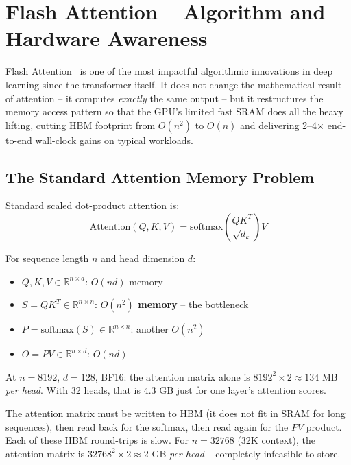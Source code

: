 \section{Flash Attention -- Algorithm and Hardware Awareness}
\label{flash-attention-algorithm-and-hardware-awareness}

Flash Attention~\cite{dao2022flashattention, dao2023flashattention2} is one of the most impactful algorithmic innovations in deep learning since the transformer itself. It does not change the mathematical result of attention -- it computes \emph{exactly} the same output -- but it restructures the memory access pattern so that the GPU’s limited fast SRAM does all the heavy lifting, cutting HBM footprint from $O(n^2)$ to $O(n)$ and delivering 2--4$\times$ end-to-end wall-clock gains on typical workloads.

\subsection{The Standard Attention Memory Problem}
\label{the-standard-attention-memory-problem}

Standard scaled dot-product attention is: 
\[
\text{Attention}(Q, K, V) = \text{softmax}\!\left(\frac{QK^T}{\sqrt{d_k}}\right) V
\]

\begin{keybox}
For sequence length $n$ and head dimension $d$:

\begin{itemize}
  \item $Q, K, V \in \mathbb{R}^{n \times d}$: $O(nd)$ memory
  \item $S = QK^T \in \mathbb{R}^{n \times n}$: \textbf{$O(n^2)$ memory} -- the bottleneck
  \item $P = \text{softmax}(S) \in \mathbb{R}^{n \times n}$: another $O(n^2)$
  \item $O = PV \in \mathbb{R}^{n \times d}$: $O(nd)$
\end{itemize}

At $n=8192$, $d=128$, BF16: the attention matrix alone is $8192^2 \times 2 \approx 134$ MB \emph{per head}. With 32 heads, that is 4.3 GB just for one layer’s attention scores.
\end{keybox}

\begin{intuitionbox}
The attention matrix must be written to HBM (it does not fit in SRAM for long sequences), then read back for the softmax, then read again for the $PV$ product. Each of these HBM round-trips is slow. For $n=32768$ (32K context), the attention matrix is $32768^2 \times 2 \approx 2$ GB \emph{per head} -- completely infeasible to store.
\end{intuitionbox}

